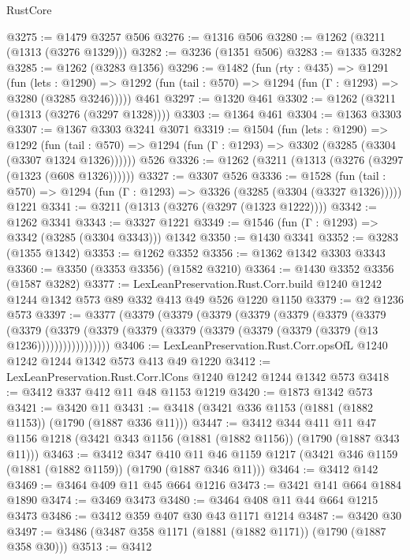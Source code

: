 \begin{lexlean}{RustCore}
\begin{coremodule}
@3275 := @1479 @3257 @506
@3276 := @1316 @506
@3280 := @1262 (@3211 (@1313 (@3276 @1329)))
@3282 := @3236 (@1351 @506)
@3283 := @1335 @3282
@3285 := @1262 (@3283 @1356)
@3296 := @1482
    (fun (rty : @435) =>
    @1291
      (fun (lets : @1290) =>
      @1292 (fun (tail : @570) => @1294 (fun (Γ : @1293) => @3280 (@3285 @3246)))))
    @461
@3297 := @1320 @461
@3302 := @1262 (@3211 (@1313 (@3276 (@3297 @1328))))
@3303 := @1364 @461
@3304 := @1363 @3303
@3307 := @1367 @3303 @3241 @3071
@3319 := @1504
    (fun (lets : @1290) =>
    @1292
      (fun (tail : @570) => @1294 (fun (Γ : @1293) => @3302 (@3285 (@3304 (@3307 @1324 @1326))))))
    @526
@3326 := @1262 (@3211 (@1313 (@3276 (@3297 (@1323 (@608 @1326))))))
@3327 := @3307 @526
@3336 := @1528
    (fun (tail : @570) => @1294 (fun (Γ : @1293) => @3326 (@3285 (@3304 (@3327 @1326)))))
    @1221
@3341 := @3211 (@1313 (@3276 (@3297 (@1323 @1222))))
@3342 := @1262 @3341
@3343 := @3327 @1221
@3349 := @1546 (fun (Γ : @1293) => @3342 (@3285 (@3304 @3343))) @1342
@3350 := @1430 @3341
@3352 := @3283 (@1355 @1342)
@3353 := @1262 @3352
@3356 := @1362 @1342 @3303 @3343
@3360 := @3350 (@3353 @3356) (@1582 @3210)
@3364 := @1430 @3352 @3356 (@1587 @3282)
@3377 := LexLeanPreservation.Rust.Corr.build
    @1240
    @1242
    @1244
    @1342
    @573
    @89
    @332
    @413
    @49
    @526
    @1220
    @1150
@3379 := @2 @1236 @573
@3397 := @3377
    (@3379
      (@3379
        (@3379
          (@3379
            (@3379
              (@3379
                (@3379
                  (@3379
                    (@3379
                      (@3379 (@3379 (@3379 (@3379 (@3379 (@3379 (@3379 (@13 @1236)))))))))))))))))
@3406 := LexLeanPreservation.Rust.Corr.opsOfL @1240 @1242 @1244 @1342 @573 @413 @49 @1220
@3412 := LexLeanPreservation.Rust.Corr.lCons @1240 @1242 @1244 @1342 @573
@3418 := @3412 @337 @412 @11 @48 @1153 @1219
@3420 := @1873 @1342 @573
@3421 := @3420 @11
@3431 := @3418 (@3421 @336 @1153 (@1881 (@1882 @1153)) (@1790 (@1887 @336 @11)))
@3447 := @3412
    @344
    @411
    @11
    @47
    @1156
    @1218
    (@3421 @343 @1156 (@1881 (@1882 @1156)) (@1790 (@1887 @343 @11)))
@3463 := @3412
    @347
    @410
    @11
    @46
    @1159
    @1217
    (@3421 @346 @1159 (@1881 (@1882 @1159)) (@1790 (@1887 @346 @11)))
@3464 := @3412 @142
@3469 := @3464 @409 @11 @45 @664 @1216
@3473 := @3421 @141 @664 @1884 @1890
@3474 := @3469 @3473
@3480 := @3464 @408 @11 @44 @664 @1215 @3473
@3486 := @3412 @359 @407 @30 @43 @1171 @1214
@3487 := @3420 @30
@3497 := @3486 (@3487 @358 @1171 (@1881 (@1882 @1171)) (@1790 (@1887 @358 @30)))
@3513 := @3412

\end{coremodule}
\end{lexlean}
